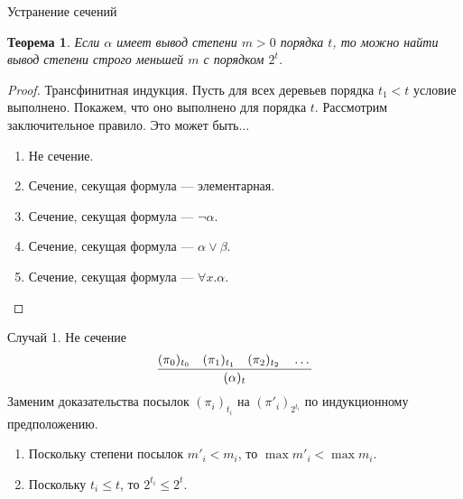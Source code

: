 \documentclass[aspectratio=169]{beamer}
\newtheorem{thm}{Теорема}[section]
\begin{document}
\begin{frame}{Устранение сечений}
\begin{thm}Если $\alpha$ имеет вывод степени $m>0$ порядка $t$, то
можно найти вывод степени строго меньшей $m$ с порядком $2^t$.
\end{thm}

\begin{proof}Трансфинитная индукция. Пусть для всех деревьев порядка $t_1 < t$ 
условие выполнено. Покажем, что оно выполнено для порядка $t$.
Рассмотрим заключительное правило. Это может быть...

\begin{enumerate}
\item Не сечение.
\item Сечение, секущая формула --- элементарная.
\item Сечение, секущая формула --- $\neg\alpha$.
\item Сечение, секущая формула --- $\alpha\vee\beta$.
\item Сечение, секущая формула --- $\forall x.\alpha$.
\end{enumerate}
\end{proof}
\end{frame}

\begin{frame}{Случай 1. Не сечение}
$$\infer{(\alpha)_{t}}{(\pi_0)_{t_0}\quad(\pi_1)_{t_1}\quad(\pi_2)_{t_2}\quad\dots}$$
Заменим доказательства посылок $(\pi_i)_{t_i}$ на $(\pi'_i)_{2^{t_i}}$ по индукционному предположению.

\begin{enumerate}
\item Поскольку степени посылок $m'_i < m_i$, то $\max m'_i < \max m_i$.
\item Поскольку $t_i \le t$, то $2^{t_i} \le 2^t$.
\end{enumerate}
\end{frame}
\end{document}
